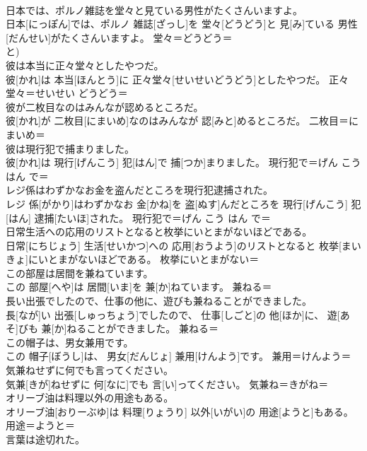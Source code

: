 \documentclass[8pt]{extreport}
\begin{document}
\begin{CJK}{UTF8}{min}
\\	日本では、ポルノ雑誌を堂々と見ている男性がたくさんいますよ。	
\\	日本[にっぽん]では、ポルノ 雑誌[ざっし]を 堂々[どうどう]と 見[み]ている 男性[だんせい]がたくさんいますよ。	堂々＝どうどう＝ 
\\	と)
\\	彼は本当に正々堂々としたやつだ。	
\\	彼[かれ]は 本当[ほんとう]に 正々堂々[せいせいどうどう]としたやつだ。	正々堂々＝せいせい どうどう＝ 
\\	彼が二枚目なのはみんなが認めるところだ。	
\\	彼[かれ]が 二枚目[にまいめ]なのはみんなが 認[みと]めるところだ。	二枚目＝にまいめ＝ 
\\	彼は現行犯で捕まりました。	
\\	彼[かれ]は 現行[げんこう] 犯[はん]で 捕[つか]まりました。	現行犯で＝げん こう はん で＝ 
\\	レジ係はわずかなお金を盗んだところを現行犯逮捕された。	
\\	レジ 係[がかり]はわずかなお 金[かね]を 盗[ぬす]んだところを 現行[げんこう] 犯[はん] 逮捕[たいほ]された。	現行犯で＝げん こう はん で＝ 
\\	日常生活への応用のリストとなると枚挙にいとまがないほどである。	
\\	日常[にちじょう] 生活[せいかつ]への 応用[おうよう]のリストとなると 枚挙[まいきょ]にいとまがないほどである。	枚挙にいとまがない＝ 
\\	この部屋は居間を兼ねています。	
\\	この 部屋[へや]は 居間[いま]を 兼[か]ねています。	兼ねる＝ 
\\	長い出張でしたので、仕事の他に、遊びも兼ねることができました。	
\\	長[なが]い 出張[しゅっちょう]でしたので、 仕事[しごと]の 他[ほか]に、 遊[あそ]びも 兼[か]ねることができました。	兼ねる＝ 
\\	この帽子は、男女兼用です。	
\\	この 帽子[ぼうし]は、 男女[だんじょ] 兼用[けんよう]です。	兼用＝けんよう＝ 
\\	気兼ねせずに何でも言ってください。	
\\	気兼[きが]ねせずに 何[なに]でも 言[い]ってください。	気兼ね＝きがね＝ 
\\	オリーブ油は料理以外の用途もある。	
\\	オリーブ油[おりーぶゆ]は 料理[りょうり] 以外[いがい]の 用途[ようと]もある。	用途＝ようと＝ 
\\	言葉は途切れた。	

\end{CJK}
\end{document}
